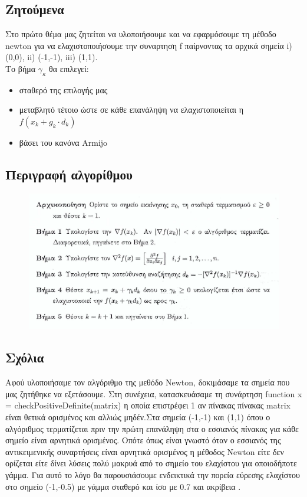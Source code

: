 \documentclass{article}
\begin{document}
\subsection*{Ζητούμενα}
Στο πρώτο θέμα μας ζητείται να υλοποιήσουμε και να εφαρμόσουμε τη μέθοδο newton για να ελαχιστοποιήσουμε την συναρτηση f  παίρνοντας τα αρχικά σημεία i) (0,0), ii) (-1,-1), iii) (1,1).\\Το βήμα $γ_κ$ θα επιλεγεί:
\begin{itemize}
\item σταθερό της επιλογής μας
\item μεταβλητό τέτοιο ώστε σε κάθε επανάληψη να ελαχιστοποιείται η $f(x_k+g_k \cdot d_k )$ 
\item  βάσει του κανόνα Armijo
\end{itemize}
\subsection*{Περιγραφή αλγορίθμου}
\begin{figure}[h!]	
     \centering  
     \advance\leftskip-0.2cm  
  \includegraphics[width=130mm,scale=2]{desc2.png}
\end{figure} 
\clearpage
\subsection*{Σχόλια}
Αφού υλοποιήσαμε τον αλγόριθμο της μεθόδο Newton, δοκιμάσαμε τα σημεία που μας ζητήθηκε να εξετάσουμε. Στη συνέχεια, κατασκευάσαμε τη συνάρτηση function x = checkPositiveDefinite(matrix) η οποία επιστρέφει 1 αν πίνακας πίνακας matrix είναι θετικά ορισμένος και αλλιώς μηδέν.Στα σημεία  (-1,-1) και (1,1) όπου ο αλγόριθμος τερματίζεται πριν την πρώτη επανάληψη στα  ο εσσιανός πίνακας για κάθε σημείο είναι αρνητικά ορισμένος. Οπότε όπως είναι γνωστό όταν ο εσσιανός της αντικειμενικής συναρτήσεις είναι αρνητικά ορισμένος η μέθοδος Newton είτε δεν ορίζεται είτε δίνει λύσεις πολύ μακρυά από  το σημείο του ελαχίστου για οποιοδήποτε γάμμα. Για αυτό το λόγο θα παρουσιάσουμε ενδεικτικά  την πορεία εύρεσης ελαχίστου στο σημείο  (-1,-0.5) με γάμμα σταθερό και ίσο με 0.7 και ακρίβεια .
 
\end{document}
